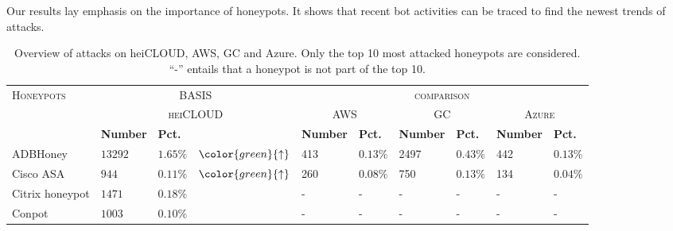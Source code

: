 Our results lay emphasis on the importance of honeypots.
It shows that recent bot activities can be traced to find the newest trends of attacks.

\begin{table}
    \centering
    \caption[Overview of attacks on cloud providers]{Overview of attacks on heiCLOUD, AWS, GC and Azure. Only the top 10 most attacked honeypots are considered. \enquote{-} entails that a honeypot is not part of the top 10.}
    \begin{tabularx}{\linewidth}{l|XXc|XX|XX|XX}
        \toprule
        \textsc{Honeypots} & \multicolumn{3}{c}{BASIS}              & \multicolumn{6}{c}{\textsc{comparison}}                                                                                                                                                             \\
                           & \multicolumn{3}{c|}{\textsc{heiCLOUD}} & \multicolumn{2}{c|}{\textsc{AWS}}       & \multicolumn{2}{c|}{\textsc{GC}} & \multicolumn{2}{c}{\textsc{Azure}}                                                                                     \\
                           & \textbf{Number}                        & \textbf{Pct.}                           &                                  & \textbf{Number}                    & \textbf{Pct.} & \textbf{Number} & \textbf{Pct.} & \textbf{Number} & \textbf{Pct.} \\
        \hline
        ADBHoney           & $13292$                                & $1.65\%$                                & $\color{green}{\uparrow}$        & 413                                & $0.13\%$      & 2497            & $0.43\%$      & 442             & $0.13\%$      \\
        Cisco ASA          & $944$                                  & $0.11\%$                                & $\color{green}{\uparrow}$        & 260                                & $0.08\%$      & 750             & $0.13\%$      & 134             & $0.04\%$      \\
        Citrix honeypot    & $1471$                                 & $0.18\%$                                &                                  & -                                  & -             & -               & -             & -               & -             \\
        Conpot             & $1003$                                 & $0.10\%$                                &                                  & -                                  & -             & -               & -             & -               & -             \\

\end{tabularx}
\end{table}
